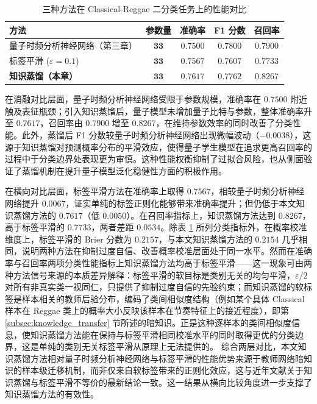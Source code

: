 \begin{table}[!htb]
	\centering
	\caption{三种方法在 Classical-Reggae 二分类任务上的性能对比}
	\label{tab:ablation_study}
	\renewcommand{\arraystretch}{1.3}
	\begin{tabular}{lcccc}
		\toprule
		\textbf{方法} & \textbf{参数量} & \textbf{准确率} & \textbf{F1 分数} & \textbf{召回率} \\
		\midrule
		量子时频分析神经网络（第三章） & $\mathbf{33}$ & $0.7500$ & $0.7800$ & $0.7900$ \\
		标签平滑 ($\varepsilon=0.1$) & $\mathbf{33}$ & $0.7567$ & $0.7607$ & $0.7733$ \\
		\textbf{知识蒸馏（本章）} & $\mathbf{33}$ & $\mathbf{0.7617}$ & $\mathbf{0.7762}$ & $\mathbf{0.8267}$ \\
		\bottomrule
	\end{tabular}
\end{table}

在消融对比层面，量子时频分析神经网络受限于参数规模，准确率在 $0.7500$ 附近触及表征瓶颈；引入知识蒸馏后，量子模型未增加量子比特与参数，整体准确率升至 $0.7617$，召回率由 $0.7900$ 增至 $0.8267$，在维持参数效率的同时改善了分类性能。此外，蒸馏后 F1 分数较量子时频分析神经网络出现微幅波动（$-0.0038$），这源于知识蒸馏对预测概率分布的平滑效应，使得量子学生模型在追求更高召回率的过程中于分类边界处表现更为审慎。这种性能权衡抑制了过拟合风险，也从侧面验证了蒸馏机制在提升量子模型泛化稳健性方面的积极作用。

在横向对比层面，标签平滑方法在准确率上取得 $0.7567$，相较量子时频分析神经网络提升 $0.0067$，证实单纯的标签正则化能够带来准确率提升；但仍低于本文知识蒸馏方法的 $0.7617$（低 $0.0050$）。在召回率指标上，知识蒸馏方法达到 $0.8267$，高于标签平滑的 $0.7733$，两者差距 $0.0534$。除表 \ref{tab:ablation_study} 所列分类指标外，在概率校准维度上，标签平滑的 Brier 分数为 $0.2157$，与本文知识蒸馏方法的 $0.2154$ 几乎相同，说明两种方法在抑制过度自信、改善概率校准层面处于同一水平。然而在准确率与召回率两项分类性能指标上知识蒸馏方法均高于标签平滑——这一现象可由两种方法信号来源的本质差异解释：标签平滑的软目标是类别无关的均匀平滑，$\varepsilon/2$ 对所有非真实类一视同仁，只提供了抑制过度自信的先验约束；而知识蒸馏的软标签是样本相关的教师后验分布，编码了类间相似度结构（例如某个具体 Classical 样本在 Reggae 类上的概率大小反映该样本在节奏特征上的接近程度），即第 \ref{subsec:knowledge_transfer} 节所述的暗知识。正是这种逐样本的类间相似度信息，使知识蒸馏方法能在保持与标签平滑相同校准水平的同时取得更优的分类边界，这是单纯的类别无关标签平滑从原理上无法提供的。
综合两层对比，本文知识蒸馏方法相对量子时频分析神经网络与标签平滑的性能优势来源于教师网络暗知识的样本级迁移机制，而非仅来自软标签带来的正则化效应，这与近年文献关于知识蒸馏与标签平滑不等价的最新结论一致。这一结果从横向比较角度进一步支撑了知识蒸馏方法的有效性。

